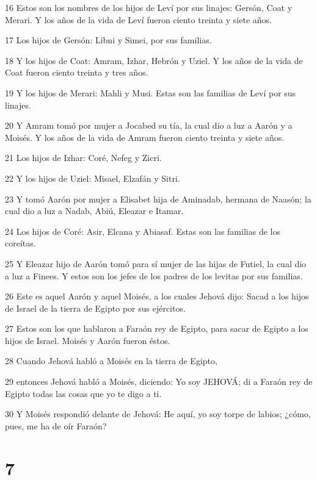 \par 16 Estos son los nombres de los hijos de Leví por sus linajes: Gersón, Coat y Merari. Y los años de la vida de Leví fueron ciento treinta y siete años.
\par 17 Los hijos de Gersón: Libni y Simei, por sus familias.
\par 18 Y los hijos de Coat: Amram, Izhar, Hebrón y Uziel. Y los años de la vida de Coat fueron ciento treinta y tres años.
\par 19 Y los hijos de Merari: Mahli y Musi. Estas son las familias de Leví por sus linajes.
\par 20 Y Amram tomó por mujer a Jocabed su tía, la cual dio a luz a Aarón y a Moisés. Y los años de la vida de Amram fueron ciento treinta y siete años.
\par 21 Los hijos de Izhar: Coré, Nefeg y Zicri.
\par 22 Y los hijos de Uziel: Misael, Elzafán y Sitri.
\par 23 Y tomó Aarón por mujer a Elisabet hija de Aminadab, hermana de Naasón; la cual dio a luz a Nadab, Abiú, Eleazar e Itamar.
\par 24 Los hijos de Coré: Asir, Elcana y Abiasaf. Estas son las familias de los coreítas.
\par 25 Y Eleazar hijo de Aarón tomó para sí mujer de las hijas de Futiel, la cual dio a luz a Finees. Y estos son los jefes de los padres de los levitas por sus familias.
\par 26 Este es aquel Aarón y aquel Moisés, a los cuales Jehová dijo: Sacad a los hijos de Israel de la tierra de Egipto por sus ejércitos.
\par 27 Estos son los que hablaron a Faraón rey de Egipto, para sacar de Egipto a los hijos de Israel. Moisés y Aarón fueron éstos.
\par 28 Cuando Jehová habló a Moisés en la tierra de Egipto,
\par 29 entonces Jehová habló a Moisés, diciendo: Yo soy JEHOVÁ; di a Faraón rey de Egipto todas las cosas que yo te digo a ti.
\par 30 Y Moisés respondió delante de Jehová: He aquí, yo soy torpe de labios; ¿cómo, pues, me ha de oír Faraón?

\chapter{7}


